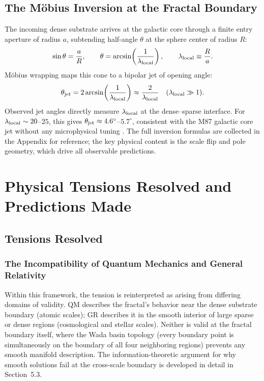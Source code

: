 \documentclass[11pt,letterpaper]{article}
\begin{document}
\subsection{The M\"{o}bius Inversion at the Fractal Boundary}
\label{sec:mobius}
The incoming dense substrate arrives at the galactic core through a finite entry
aperture of radius $a$, subtending half-angle $\theta$ at the sphere center of
radius $R$:
\begin{equation}
\sin\theta=\frac{a}{R},\qquad
\theta=\arcsin\!\left(\frac{1}{\lambda_{\rm local}}\right),\qquad
\lambda_{\rm local}\equiv\frac{R}{a}.
\end{equation}
M\"obius wrapping maps this cone to a bipolar jet of opening angle:
\begin{equation}
\theta_{\rm jet}=2\arcsin\!\left(\frac{1}{\lambda_{\rm local}}\right)
\approx\frac{2}{\lambda_{\rm local}}\quad(\lambda_{\rm local}\gg 1).
\label{eq:jet_angle}
\end{equation}
Observed jet angles directly measure $\lambda_{\rm local}$ at the dense--sparse
interface. For $\lambda_{\rm local}\sim 20$--$25$, this gives
$\theta_{\rm jet}\approx 4.6^\circ$--$5.7^\circ$, consistent with the M87 galactic
core jet without any microphysical tuning \cite{Nikonov2023}. The full inversion
formulas are collected in the Appendix for reference; the key physical content is
the scale flip and pole geometry, which drive all observable predictions.

\section{Physical Tensions Resolved and Predictions Made}
\label{sec:tensions}

\subsection{Tensions Resolved}

\subsubsection{The Incompatibility of Quantum Mechanics and General Relativity}
Within this framework, the tension is reinterpreted as arising from differing
domains of validity. QM describes the fractal's behavior near the dense substrate
boundary (atomic scales); GR describes it in the smooth interior of large sparse or
dense regions (cosmological and stellar scales). Neither is valid at the fractal
boundary itself, where the Wada basin topology (every boundary point is
simultaneously on the boundary of all four neighboring regions) prevents any smooth
manifold description. The information-theoretic argument for why smooth solutions
fail at the cross-scale boundary is developed in detail in \cite{FSEP-I}
Section~5.3.
\end{document}
